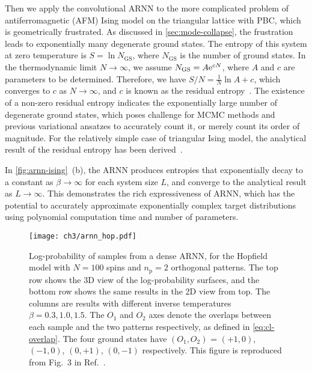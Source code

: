 Then we apply the convolutional ARNN to the more complicated problem of antiferromagnetic (AFM) Ising model on the triangular lattice with PBC, which is geometrically frustrated. As discussed in \cref{sec:mode-collapse}, the frustration leads to exponentially many degenerate ground states. The entropy of this system at zero temperature is $S = \ln N_\text{GS}$, where $N_\text{GS}$ is the number of ground states. In the thermodynamic limit $N \to \infty$, we assume $N_\text{GS} = A \mathrm{e}^{c N}$, where $A$ and $c$ are parameters to be determined. Therefore, we have $S / N = \frac{1}{N} \ln A + c$, which converges to $c$ as $N \to \infty$, and $c$ is known as the residual entropy~\cite{wannier1950antiferromagnetism, mambrini1999residual, vanderstraeten2018residual}. The existence of a non-zero residual entropy indicates the exponentially large number of degenerate ground states, which poses challenge for MCMC methods and previous variational ansatzes to accurately count it, or merely count its order of magnitude. For the relatively simple case of triangular Ising model, the analytical result of the residual entropy has been derived~\cite{wannier1950antiferromagnetism, wannier1973antiferromagnetism}.

In \cref{fig:arnn-ising}~(b), the ARNN produces entropies that exponentially decay to a constant as $\beta \to \infty$ for each system size $L$, and converge to the analytical result as $L \to \infty$. This demonstrates the rich expressiveness of ARNN, which has the potential to accurately approximate exponentially complex target distributions using polynomial computation time and number of parameters.

\begin{figure}[htb]
\centering
\texttt{[image: ch3/arnn\_hop.pdf]}
\caption[ARNN results of Hopfield model]{
Log-probability of samples from a dense ARNN, for the Hopfield model with $N = 100$ spins and $n_\text{p} = 2$ orthogonal patterns.
The top row shows the 3D view of the log-probability surfaces, and the bottom row shows the same results in the 2D view from top.
The columns are results with different inverse temperatures $\beta = 0.3, 1.0, 1.5$.
The $O_1$ and $O_2$ axes denote the overlaps between each sample and the two patterns respectively, as defined in \cref{eq:cl-overlap}.
The four ground states have $(O_1, O_2)$ = $(+1, 0)$, $(-1, 0)$, $(0, +1)$, $(0, -1)$ respectively.
This figure is reproduced from Fig.~3 in Ref.~\cite{wu2019solving}.
}
\label{fig:arnn-hop}
\end{figure}

